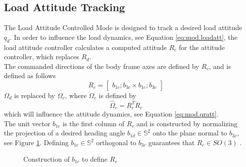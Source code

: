 \subsection{Load Attitude Tracking}\label{sec:con.loadatt}
The Load Attitude Controlled Mode is designed to track a desired load attitude $ q_d $.
In order to influence the load dynamics, see Equation \ref{eq:mod.loadatt}, the load attitude controller calculates a computed  attitude $ R_c $ for the  attitude controller, which replaces $ R_d $.\\
The commanded directions of the body frame axes are defined by $ R_c $, and is defined as follows
\begin{equation}\label{eq:con.R}
R_c = \begin{bmatrix}
b_{1c}; b_{3c}\times b_{1c};b_{3c}
\end{bmatrix}
\end{equation}
$ \Omega_d $ is replaced by $ \Omega_c $, where $ \Omega_c $ is defined by
\begin{equation}\label{key}
\hat{\Omega}_c=R_c^T\dot{R}_c
\end{equation}
which will influence the  attitude dynamics, see Equation \ref{eq:mod.qratt}.\\
The unit vector $ b_{1c} $ is the first column of $ R_c $ and is constructed by normalizing the projection of a desired heading angle $ b_{1d}\in \mathbb{S}^2 $ onto the plane normal to $ b_{3c} $, see Figure \ref{fig:con.b1c}. Defining $ b_{1c}\in\mathbb{S}^2$ orthogonal to  $ b_{3c}$ guarantees that $ R_c \in SO(3) $ \cite{Lee2010c}.
\begin{figure}[h!]
	\centering
	\caption{Construction of  $ b_{1c} $ to define $ R_c $\label{fig:con.b1c}}
\end{figure}	

